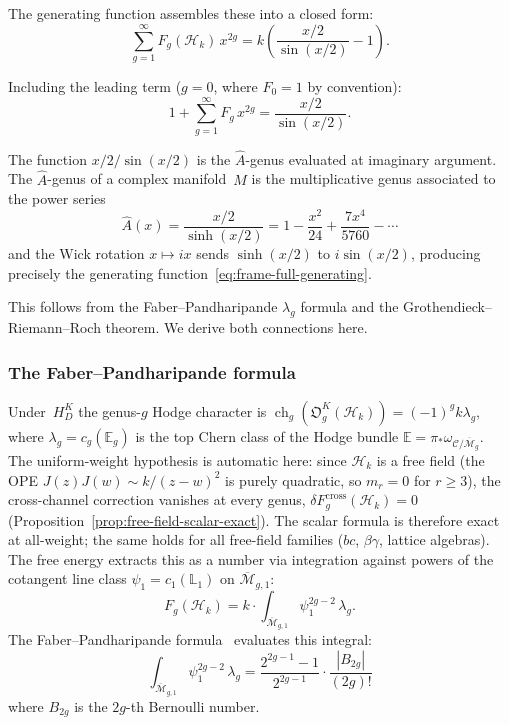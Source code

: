 The generating function assembles these into a closed form:
\begin{equation}\label{eq:frame-generating-function}
\sum_{g=1}^{\infty} F_g(\mathcal{H}_k)\, x^{2g}
= k\left(\frac{x/2}{\sin(x/2)} - 1\right).
\end{equation}

Including the leading term ($g = 0$, where $F_0 = 1$ by convention):
\begin{equation}\label{eq:frame-full-generating}
1 + \sum_{g=1}^{\infty} F_g\, x^{2g}
= \frac{x/2}{\sin(x/2)}.
\end{equation}

The function $x/2 / \sin(x/2)$ is the $\hat{A}$-genus evaluated at
imaginary argument. The $\hat{A}$-genus of a complex manifold~$M$
is the multiplicative genus associated to the power series
\begin{equation}\label{eq:frame-a-hat-def}
\hat{A}(x) = \frac{x/2}{\sinh(x/2)}
= 1 - \frac{x^2}{24} + \frac{7x^4}{5760} - \cdots
\end{equation}
and the Wick rotation $x \mapsto ix$ sends $\sinh(x/2)$ to
$i\sin(x/2)$, producing precisely the generating
function~\eqref{eq:frame-full-generating}.

This follows from the
Faber--Pandharipande $\lambda_g$ formula and the Grothendieck--Riemann--Roch
theorem. We derive both connections here.

\subsubsection*{The Faber--Pandharipande formula}

Under~$H_D^K$ the genus-$g$ Hodge character is
$\operatorname{ch}_g(\mathfrak O_g^K(\mathcal H_k))=
(-1)^gk\lambda_g$, where $\lambda_g=c_g(\mathbb E_g)$ is the top
Chern class of the Hodge bundle
$\mathbb{E} = \pi_*\omega_{\mathcal{C}/\overline{\mathcal{M}}_g}$.
The uniform-weight hypothesis is automatic here: since
$\mathcal{H}_k$ is a free field
(the OPE $J(z)J(w) \sim k/(z-w)^2$ is purely quadratic, so
$m_r = 0$ for $r \geq 3$),
the cross-channel correction vanishes at every genus,
$\delta F_g^{\mathrm{cross}}(\mathcal{H}_k) = 0$
(Proposition~\ref{prop:free-field-scalar-exact}).
The scalar formula is therefore exact at all-weight;
the same holds for all free-field families ($bc$, $\beta\gamma$, lattice algebras).
The free energy extracts this as a number via integration against
powers of the cotangent line class $\psi_1 = c_1(\mathbb{L}_1)$
on $\overline{\mathcal{M}}_{g,1}$:
\begin{equation}\label{eq:frame-fp-integral}
F_g(\mathcal{H}_k) = k \cdot
\int_{\overline{\mathcal{M}}_{g,1}} \psi_1^{2g-2}\, \lambda_g.
\end{equation}
The Faber--Pandharipande formula~\cite{FP03} evaluates this integral:
\begin{equation}\label{eq:frame-fp-formula}
\int_{\overline{\mathcal{M}}_{g,1}} \psi_1^{2g-2}\, \lambda_g
= \frac{2^{2g-1}-1}{2^{2g-1}} \cdot \frac{|B_{2g}|}{(2g)!}
\end{equation}
where $B_{2g}$ is the $2g$-th Bernoulli number.

